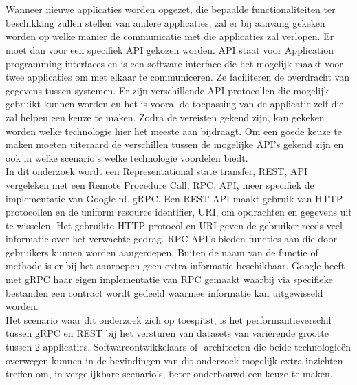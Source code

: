 
\chapter{}%
\label{ch:inleiding}

Wanneer nieuwe applicaties worden opgezet, die bepaalde functionaliteiten ter beschikking zullen stellen van andere applicaties, zal er bij aanvang gekeken worden
op welke manier de communicatie met die applicaties zal verlopen. Er moet dan voor een specifiek API gekozen worden.
API staat voor Application programming interfaces en is een software-interface die het mogelijk maakt voor twee
applicaties om met elkaar te communiceren. Ze faciliteren de overdracht van gegevens tussen systemen. Er zijn verschillende API protocollen die mogelijk gebruikt kunnen worden
en het is vooral de toepassing van de applicatie zelf die zal helpen een keuze te maken. Zodra de vereisten gekend zijn, kan gekeken worden welke technologie hier
het meeste aan bijdraagt. Om een goede keuze te maken moeten uiteraard de verschillen tussen de mogelijke API's gekend zijn en ook in welke scenario's welke technologie voordelen biedt.\\

In dit onderzoek wordt een Representational state transfer, REST, API vergeleken met een Remote Procedure Call, RPC, API, meer specifiek de
implementatie van Google nl. gRPC. Een REST API maakt gebruik van HTTP-protocollen en de uniform resource identifier, URI, om opdrachten en gegevens uit te wisselen.
Het gebruikte HTTP-protocol en URI geven de gebruiker reeds veel informatie over het verwachte gedrag.
RPC API's bieden functies aan die door gebruikers kunnen worden aangeroepen.
Buiten de naam van de functie of methode is er bij het aanroepen geen extra informatie beschikbaar.
Google heeft met gRPC haar eigen implementatie van RPC gemaakt waarbij via specifieke bestanden een contract wordt gedeeld waarmee informatie kan uitgewisseld worden.\\

Het scenario waar dit onderzoek zich op toespitst, is het performantieverschil tussen gRPC en REST bij het versturen van datasets van variërende grootte tussen 2 applicaties.
Softwareontwikkelaars of -architecten die beide technologie\"en overwegen kunnen in de bevindingen van dit onderzoek mogelijk extra inzichten treffen
om, in vergelijkbare scenario's, beter onderbouwd een keuze te maken.\\

